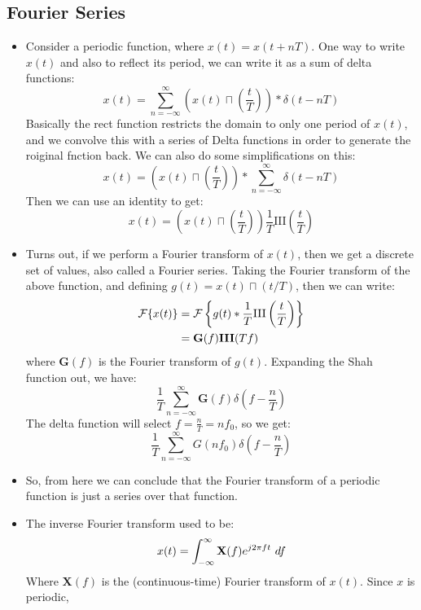 \subsection{Fourier Series}
\begin{itemize}
	\item Consider a periodic function, where \( x(t) = x(t + nT) \). One way to write \( x(t) \) and also to 
		reflect its period, we can write it as a sum of delta functions: 
		\[
		x(t) = \sum_{n=-\infty}^{\infty} \left( x(t) \sqcap\left( \frac{t}{T} \right)  \right) * \delta(t - nT) 
		\] 
		Basically the rect function restricts the domain to only one period of \( x(t) \), and we convolve this with 
		a series of Delta functions in order to generate the roiginal fnction back. We can also do some simplifications
		on this: 
		\[
		x(t) = \left( x(t) \sqcap\left( \frac{t}{T} \right)  \right) * \sum_{n=-\infty}^{\infty} \delta(t - nT) 
		\] 
		Then we can use an identity to get: 
		\[
		x(t) = \left( x(t) \sqcap\left( \frac{t}{T} \right)  \right) \frac{1}{T}\text{III}\left( \frac{t}{T} \right) 
		\] 
	\item Turns out, if we perform a Fourier transform of \( x(t) \), then we get a discrete set of values, 
		also called a Fourier series. Taking the Fourier transform of the above function, and defining 
		\( g(t) = x(t) \sqcap(t / T) \), then we can write: 
		\begin{align*}
			\mathcal F \{x(t)\} &= \mathcal F \left\{g(t) * \frac{1}{T}\text{III}\left( \frac{t}{T} \right) \right\}  \\
								&= \mathbf G(f) \text{\textbf{III}} (Tf)
		\end{align*}
		where \( \mathbf G(f) \) is the Fourier transform of \( g(t) \).  Expanding the Shah function out, we 
		have: 
		\[
		\frac{1}{T}\sum_{n=-\infty}^{\infty} \mathbf G(f) \delta\left( f - \frac{n}{T} \right) 
		\] 
		The delta function will select \( f = \frac{n}{T} = nf_0\), so we get: 
		\[
		\frac{1}{T}\sum_{n=-\infty}^{\infty} G(nf_0) \delta\left(f - \frac{n}{T}\right)
		\] 
	\item So, from here we can conclude that the Fourier transform of a periodic function is just a series over that 
		function. 
	\item The inverse Fourier transform used to be:
		\[
		x(t) = \int_{-\infty}^{\infty} \mathbf X(f) e^{j 2 \pi ft}\ d f 
		\] 
		Where \( \mathbf X(f) \) is the (continuous-time) Fourier transform of \( x(t) \). Since \( x \) is periodic, 

\end{itemize}
